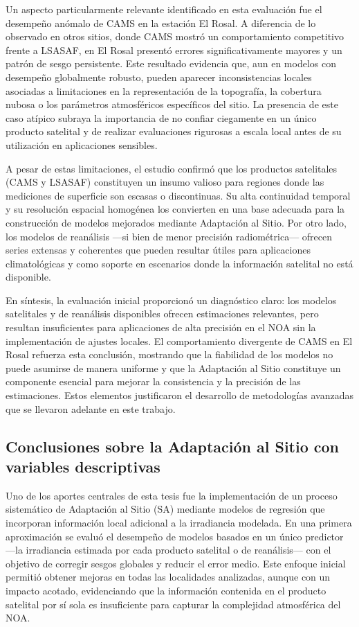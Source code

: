 Un aspecto particularmente relevante identificado en esta evaluación fue el desempeño anómalo de CAMS en la estación El Rosal. A diferencia de lo observado en otros sitios, donde CAMS mostró un comportamiento competitivo frente a LSASAF, en El Rosal presentó errores significativamente mayores y un patrón de sesgo persistente. Este resultado evidencia que, aun en modelos con desempeño globalmente robusto, pueden aparecer inconsistencias locales asociadas a limitaciones en la representación de la topografía, la cobertura nubosa o los parámetros atmosféricos específicos del sitio. La presencia de este caso atípico subraya la importancia de no confiar ciegamente en un único producto satelital y de realizar evaluaciones rigurosas a escala local antes de su utilización en aplicaciones sensibles.

A pesar de estas limitaciones, el estudio confirmó que los productos satelitales (CAMS y LSASAF) constituyen un insumo valioso para regiones donde las mediciones de superficie son escasas o discontinuas. Su alta continuidad temporal y su resolución espacial homogénea los convierten en una base adecuada para la construcción de modelos mejorados mediante Adaptación al Sitio. Por otro lado, los modelos de reanálisis —si bien de menor precisión radiométrica— ofrecen series extensas y coherentes que pueden resultar útiles para aplicaciones climatológicas y como soporte en escenarios donde la información satelital no está disponible.

En síntesis, la evaluación inicial proporcionó un diagnóstico claro: los modelos satelitales y de reanálisis disponibles ofrecen estimaciones relevantes, pero resultan insuficientes para aplicaciones de alta precisión en el NOA sin la implementación de ajustes locales. El comportamiento divergente de CAMS en El Rosal refuerza esta conclusión, mostrando que la fiabilidad de los modelos no puede asumirse de manera uniforme y que la Adaptación al Sitio constituye un componente esencial para mejorar la consistencia y la precisión de las estimaciones. Estos elementos justificaron el desarrollo de metodologías avanzadas que se llevaron adelante en este trabajo.

\subsection{Conclusiones sobre la Adaptación al Sitio con variables descriptivas}
Uno de los aportes centrales de esta tesis fue la implementación de un proceso sistemático de Adaptación al Sitio (SA) mediante modelos de regresión que incorporan información local adicional a la irradiancia modelada. En una primera aproximación se evaluó el desempeño de modelos basados en un único predictor —la irradiancia estimada por cada producto satelital o de reanálisis— con el objetivo de corregir sesgos globales y reducir el error medio. Este enfoque inicial permitió obtener mejoras en todas las localidades analizadas, aunque con un impacto acotado, evidenciando que la información contenida en el producto satelital por sí sola es insuficiente para capturar la complejidad atmosférica del NOA.

